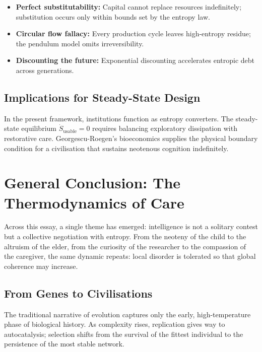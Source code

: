 \documentclass[12pt,a4paper]{article}
\theoremstyle{definition}
\begin{document}
\begin{itemize}[leftmargin=*]
  \item \textbf{Perfect substitutability:} Capital cannot replace resources
    indefinitely; substitution occurs only within bounds set by the entropy law.
  \item \textbf{Circular flow fallacy:} Every production cycle leaves
    high-entropy residue; the pendulum model omits irreversibility.
  \item \textbf{Discounting the future:} Exponential discounting accelerates
    entropic debt across generations.
\end{itemize}

\subsection{Implications for Steady-State Design}

In the present framework, institutions function as entropy converters.  The
steady-state equilibrium $\dot{S}_{\mathrm{usable}} = 0$ requires balancing
exploratory dissipation with restorative care.  Georgescu-Roegen's bioeconomics
supplies the physical boundary condition for a civilisation that sustains
neotenous cognition indefinitely.

\section{General Conclusion: The Thermodynamics of Care}

Across this essay, a single theme has emerged: intelligence is not a solitary
contest but a collective negotiation with entropy.  From the neoteny of the
child to the altruism of the elder, from the curiosity of the researcher to
the compassion of the caregiver, the same dynamic repeats: local disorder is
tolerated so that global coherence may increase.

\subsection{From Genes to Civilisations}

The traditional narrative of evolution captures only the early, high-temperature
phase of biological history.  As complexity rises, replication gives way to
autocatalysis; selection shifts from the survival of the fittest individual to
the persistence of the most stable network.
\end{document}
